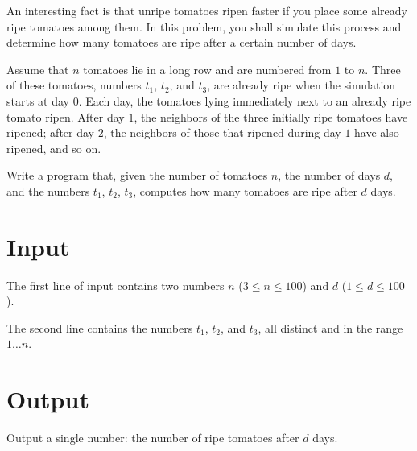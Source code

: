 An interesting fact is that unripe tomatoes ripen faster if you place some already ripe tomatoes among them.
In this problem, you shall simulate this process and determine how many tomatoes are ripe after a certain number of days.

Assume that $n$ tomatoes lie in a long row and are numbered from $1$ to $n$.
Three of these tomatoes, numbers $t_1$, $t_2$, and $t_3$, are already ripe when the simulation starts at day $0$.
Each day, the tomatoes lying immediately next to an already ripe tomato ripen.
After day $1$, the neighbors of the three initially ripe tomatoes have ripened; after day $2$, the neighbors of those that ripened during day $1$ have also ripened, and so on.

Write a program that, given the number of tomatoes $n$, the number of days $d$, and the numbers $t_1$, $t_2$, $t_3$, computes how many tomatoes are ripe after $d$ days.

\section*{Input}
The first line of input contains two numbers $n$ ($3 \le n \le 100$) and $d$ ($1 \le d \le 100$).

The second line contains the numbers $t_1$, $t_2$, and $t_3$, all distinct and in the range $1 \dots n$.

\section*{Output}
Output a single number: the number of ripe tomatoes after $d$ days.
